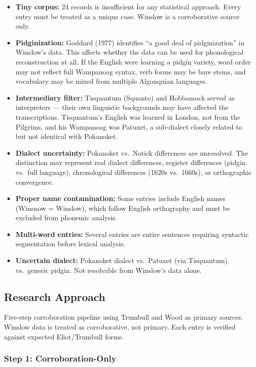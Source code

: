 \begin{itemize}
  \item \textbf{Tiny corpus:} 24 records is insufficient for any statistical
    approach. Every entry must be treated as a unique case. Winslow is a
    corroborative source only.
  \item \textbf{Pidginization:} Goddard (1977) identifies ``a good deal of
    pidginization'' in Winslow's data. This affects whether the data can be
    used for phonological reconstruction at all. If the English were learning a
    pidgin variety, word order may not reflect full Wampanoag syntax, verb forms
    may be bare stems, and vocabulary may be mixed from multiple Algonquian
    languages.
  \item \textbf{Intermediary filter:} Tisquantum (Squanto) and Hobbamock served
    as interpreters --- their own linguistic backgrounds may have affected the
    transcriptions. Tisquantum's English was learned in London, not from the
    Pilgrims, and his Wampanoag was Patuxet, a sub-dialect closely related to
    but not identical with Pokanoket.
  \item \textbf{Dialect uncertainty:} Pokanoket vs.\ Natick differences are
    unresolved. The distinction may represent real dialect differences, register
    differences (pidgin vs.\ full language), chronological differences (1620s
    vs.\ 1660s), or orthographic convergence.
  \item \textbf{Proper name contamination:} Some entries include English names
    (Winsnow = Winslow), which follow English orthography and must be excluded
    from phonemic analysis.
  \item \textbf{Multi-word entries:} Several entries are entire sentences
    requiring syntactic segmentation before lexical analysis.
  \item \textbf{Uncertain dialect:} Pokanoket dialect vs.\ Patuxet (via
    Tisquantum) vs.\ generic pidgin. Not resolvable from Winslow's data alone.
\end{itemize}

\subsection{Research Approach}

Five-step corroboration pipeline using Trumbull and Wood as primary sources.
Winslow data is treated as corroborative, not primary. Each entry is verified
against expected Eliot/Trumbull forms.

\subsubsection{Step 1: Corroboration-Only}

